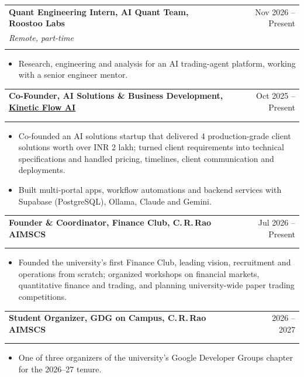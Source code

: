 \documentclass[letterpaper,10pt]{article}
\makeatletter
\newcommand{\entry}[4]{%
  \vspace{2pt}
  \begin{tabularx}{\linewidth}{@{}X@{\hspace{6pt}}r@{}}
    \textbf{#1} & #2 \\
    \if\relax\detokenize{#3}\relax\else \textit{\small #3} & \textit{\small #4} \\ \fi
  \end{tabularx}\vspace{-3pt}
}
\makeatother
\begin{document}
\entry{Quant Engineering Intern, AI Quant Team, Roostoo Labs}{Nov 2026 -- Present}{Remote, part-time}{}
\begin{itemize}
  \item Research, engineering and analysis for an AI trading-agent platform, working with a senior engineer mentor.
\end{itemize}

\entry{Co-Founder, AI Solutions \& Business Development, \href{https://www.kineticflowai.com/}{\underline{Kinetic Flow AI}}}{Oct 2025 -- Present}{}{}
\begin{itemize}
  \item Co-founded an AI solutions startup that delivered 4 production-grade client solutions worth over INR 2 lakh; turned
        client requirements into technical specifications and handled pricing, timelines, client communication and
        deployments.
  \item Built multi-portal apps, workflow automations and backend services with Supabase (PostgreSQL), Ollama, Claude
        and Gemini.
\end{itemize}

\entry{Founder \& Coordinator, Finance Club, C.\,R.\,Rao AIMSCS}{Jul 2026 -- Present}{}{}
\begin{itemize}
  \item Founded the university's first Finance Club, leading vision, recruitment and operations from scratch; organized
        workshops on financial markets, quantitative finance and trading, and planning university-wide paper trading
        competitions.
\end{itemize}

\entry{Student Organizer, GDG on Campus, C.\,R.\,Rao AIMSCS}{2026 -- 2027}{}{}
\begin{itemize}
  \item One of three organizers of the university's Google Developer Groups chapter for the 2026--27 tenure.
\end{itemize}

\end{document}
